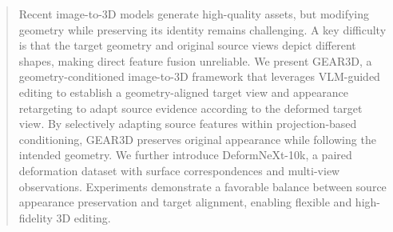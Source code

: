 \begin{abstract}
Recent image-to-3D models generate high-quality assets,
but modifying geometry while preserving its
identity remains challenging.
%
A key difficulty is that the target geometry and original
source views depict different shapes, making
direct feature fusion unreliable.
%
We present GEAR3D, a geometry-conditioned
image-to-3D framework that leverages VLM-guided editing
to establish a geometry-aligned target view and
appearance retargeting to adapt source evidence
according to the deformed target view.
%
By selectively adapting source features within
projection-based conditioning, GEAR3D preserves
original appearance while following the intended geometry.
%
We further introduce DeformNeXt-10k, a paired
deformation dataset with surface correspondences and multi-view observations.
%
Experiments demonstrate a favorable balance between source appearance
preservation and target alignment, enabling flexible and high-fidelity 3D
editing.
\end{abstract}
